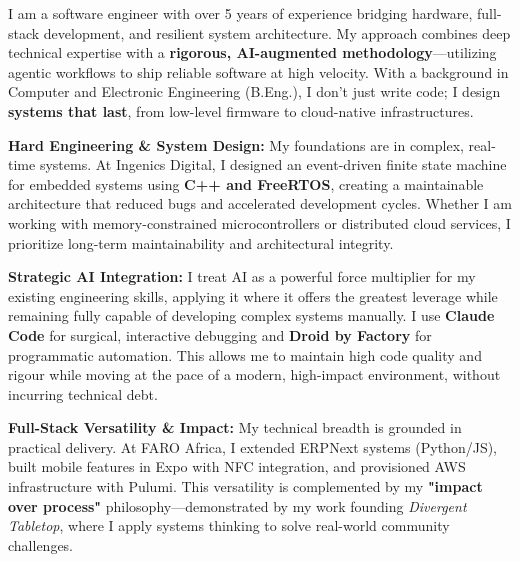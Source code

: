 \documentclass[12pt, a4paper]{awesome-cv}
\begin{document}
\makecvheader[R]


\makelettertitle

\begin{cvletter}


  I am a software engineer with over 5 years of experience bridging hardware, full-stack development, and resilient system architecture. My approach combines deep technical expertise with a \textbf{rigorous, AI-augmented methodology}—utilizing agentic workflows to ship reliable software at high velocity. With a background in Computer and Electronic Engineering (B.Eng.), I don't just write code; I design \textbf{systems that last}, from low-level firmware to cloud-native infrastructures.


  \textbf{Hard Engineering \& System Design:} My foundations are in complex, real-time systems. At Ingenics Digital, I designed an event-driven finite state machine for embedded systems using \textbf{C++ and FreeRTOS}, creating a maintainable architecture that reduced bugs and accelerated development cycles. Whether I am working with memory-constrained microcontrollers or distributed cloud services, I prioritize long-term maintainability and architectural integrity.

  \textbf{Strategic AI Integration:} I treat AI as a powerful force multiplier for my existing engineering skills, applying it where it offers the greatest leverage while remaining fully capable of developing complex systems manually. I use \textbf{Claude Code} for surgical, interactive debugging and \textbf{Droid by Factory} for programmatic automation. This allows me to maintain high code quality and rigour while moving at the pace of a modern, high-impact environment, without incurring technical debt.

  \textbf{Full-Stack Versatility \& Impact:} My technical breadth is grounded in practical delivery. At FARO Africa, I extended ERPNext systems (Python/JS), built mobile features in Expo with NFC integration, and provisioned AWS infrastructure with Pulumi. This versatility is complemented by my \textbf{"impact over process"} philosophy—demonstrated by my work founding \textit{Divergent Tabletop}, where I apply systems thinking to solve real-world community challenges.


\end{cvletter}
\end{document}
